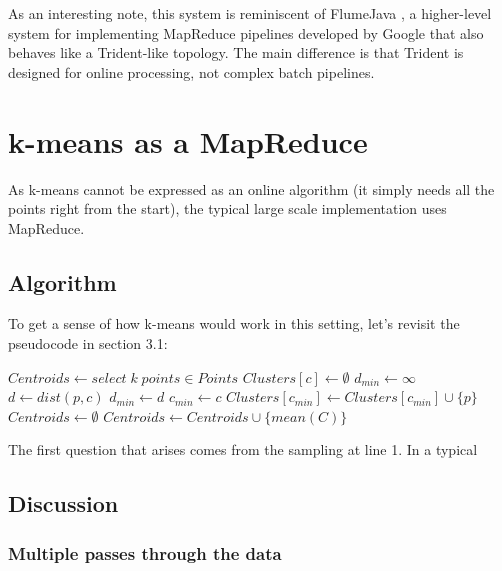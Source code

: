 \documentclass{article}
\begin{document}
As an interesting note, this system is reminiscent of FlumeJava \cite{flume}, 
a higher-level system for implementing MapReduce pipelines developed by Google
that also behaves like a Trident-like topology. The main difference is that
Trident is designed for online processing, not complex batch pipelines.

\section{k-means as a MapReduce}

As k-means cannot be expressed as an online algorithm (it simply needs all the
points right from the start), the typical large scale implementation uses
MapReduce.

\subsection{Algorithm}

To get a sense of how k-means would work in this setting, let's revisit the
pseudocode in section 3.1:

\begin{algorithmic}[1]
    \State $Centroids\gets select\; k\; points \in Points$
            \State $Clusters[c]\gets \emptyset$
        \EndFor
            \State $d_{min}\gets \infty$
                \State $d\gets dist(p, c)$
                    \State $d_{min}\gets d$
                    \State $c_{min} \gets c$
                \EndIf
            \EndFor
            \State $Clusters[c_{min}]\gets Clusters[c_{min}] \cup \{p\}$
        \EndFor
        \State $Centroids\gets \emptyset$
            \State $Centroids\gets Centroids \cup \{mean(C)\}$
        \EndFor
    \EndWhile
\end{algorithmic}

The first question that arises comes from the sampling at line 1. In a typical

\subsection{Discussion}

\subsubsection{Multiple passes through the data}
\end{document}
